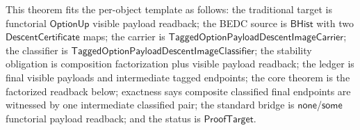 \begin{theorem}
\label{thm:tagged-option-composite-image-classifier-visible-payload-factorization}
This theorem fits the per-object template as follows: the traditional target is
functorial $\mathsf{OptionUp}$ visible payload readback; the BEDC source is
$\mathsf{BHist}$ with two $\mathsf{DescentCertificate}$ maps; the carrier is
$\mathsf{TaggedOptionPayloadDescentImageCarrier}$; the classifier is
$\mathsf{TaggedOptionPayloadDescentImageClassifier}$; the stability obligation is
composition factorization plus visible payload readback; the ledger is final
visible payloads and intermediate tagged endpoints; the core theorem is the
factorized readback below; exactness says composite classified final endpoints
are witnessed by one intermediate classified pair; the standard bridge is
$\mathsf{none}$/$\mathsf{some}$ functorial payload readback; and the status is
$\mathsf{ProofTarget}$.


\end{theorem}

